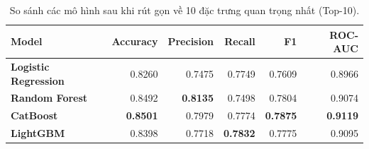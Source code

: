 \begin{table}[H]
  \centering
  \caption{So sánh các mô hình sau khi rút gọn về 10 đặc trưng quan trọng nhất (Top-10).}
  \label{tab:compare_top10}
  \small
  \setlength{\tabcolsep}{5pt}
  \begin{tabular}{lrrrrr}
    \toprule
    \textbf{Model} & \textbf{Accuracy} & \textbf{Precision} & \textbf{Recall} & \textbf{F1} & \textbf{ROC-AUC} \\
    \midrule
    \textbf{Logistic Regression} & 0.8260 & 0.7475 & 0.7749 & 0.7609 & 0.8966 \\
    \textbf{Random Forest} & 0.8492 & \textbf{0.8135} & 0.7498 & 0.7804 & 0.9074 \\
    \textbf{CatBoost} & \textbf{0.8501} & 0.7979 & 0.7774 & \textbf{0.7875} & \textbf{0.9119} \\
    \textbf{LightGBM} & 0.8398 & 0.7718 & \textbf{0.7832} & 0.7775 & 0.9095 \\
    \bottomrule
  \end{tabular}
\end{table}

